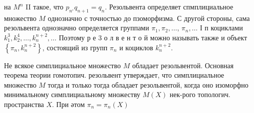 \documentclass[10pt]{article}
\begin{document}
на $M^{n}$ II такое, что $p_{n^{\circ}} q_{n+1}=q_{n}$. Резольвента определяет спмплициальное множество $M$ однозначно с точностью до пзоморфизма. С другой стороны, сама резольвента однозначно определяется группами $\pi_{1}, \pi_{2}, \ldots$, $\pi_{n}, \ldots$ І п коциклами $k_{1}^{3}, k_{2}^{4}, \ldots, k_{n}^{n+2}, \ldots$ Поэтому р е 3 о л в е н т о й можно называть также и объект $\left\{\pi_{n}, k_{n}^{n+2}\right\}$, состоящий из групп $\pi_{n}$ и коциклов $k_{n}^{n+2}$.



Не всякое симплициальное множество $M$ обладает резольвентой. Основная теорема теории гомотопич. резольвент утверждает, что симплициальное множество $M$ тогда и только тогда обладает резольвентой, когда оно изоморфно минимальному симплициальному множеству $M(X)$ нек-рого топологич. пространства $X$. При әтом $\pi_{n}=\pi_{n}(X)$
\end{document}
